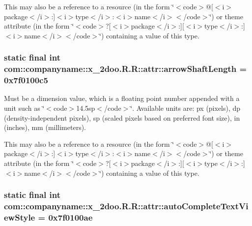 This may also be a reference to a resource (in the form \char`\"{}$<$code$>$@\mbox{[}$<$i$>$package$<$/i$>$:\mbox{]}$<$i$>$type$<$/i$>$:$<$i$>$name$<$/i$>$$<$/code$>$\char`\"{}) or theme attribute (in the form \char`\"{}$<$code$>$?\mbox{[}$<$i$>$package$<$/i$>$:\mbox{]}\mbox{[}$<$i$>$type$<$/i$>$:\mbox{]}$<$i$>$name$<$/i$>$$<$/code$>$\char`\"{}) containing a value of this type. \hypertarget{classcom_1_1companyname_1_1x__2doo_1_1_r_1_1attr_891da3a739d355886002d1c6ffaf78d2}{
\subsubsection[{arrowShaftLength}]{\setlength{\rightskip}{0pt plus 5cm}static final int com::companyname::x\_\-2doo.R.R::attr::arrowShaftLength = 0x7f0100c5}}
\label{classcom_1_1companyname_1_1x__2doo_1_1_r_1_1attr_891da3a739d355886002d1c6ffaf78d2}


Must be a dimension value, which is a floating point number appended with a unit such as \char`\"{}$<$code$>$14.5sp$<$/code$>$\char`\"{}. Available units are: px (pixels), dp (density-independent pixels), sp (scaled pixels based on preferred font size), in (inches), mm (millimeters). 

This may also be a reference to a resource (in the form \char`\"{}$<$code$>$@\mbox{[}$<$i$>$package$<$/i$>$:\mbox{]}$<$i$>$type$<$/i$>$:$<$i$>$name$<$/i$>$$<$/code$>$\char`\"{}) or theme attribute (in the form \char`\"{}$<$code$>$?\mbox{[}$<$i$>$package$<$/i$>$:\mbox{]}\mbox{[}$<$i$>$type$<$/i$>$:\mbox{]}$<$i$>$name$<$/i$>$$<$/code$>$\char`\"{}) containing a value of this type. \hypertarget{classcom_1_1companyname_1_1x__2doo_1_1_r_1_1attr_44901071c8e8c1aa78274fa2d89f51d2}{
\subsubsection[{autoCompleteTextViewStyle}]{\setlength{\rightskip}{0pt plus 5cm}static final int com::companyname::x\_\-2doo.R.R::attr::autoCompleteTextViewStyle = 0x7f0100ae}}
\label{classcom_1_1companyname_1_1x__2doo_1_1_r_1_1attr_44901071c8e8c1aa78274fa2d89f51d2}


